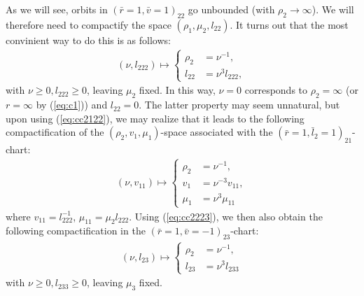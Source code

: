 \documentclass[reqno,12pt]{amsart}
\newcommand{\eqlab}[1]{\label{eq:#1}}
\renewcommand{\eqref}[1]{(\ref{eq:#1})}
\numberwithin{equation}{section}
\begin{document}
As we will see, orbits in $(\bar r=1,\bar v=1)_{22}$ go unbounded (with $\rho_2\rightarrow \infty$). We will therefore need to compactify the space $(\rho_1,\mu_2,l_{22})$. It turns out that the most convinient way to do this is as follows:
\begin{align}
 (\nu,l_{222})\mapsto \begin{cases}
                             \rho_2 &= \nu^{-1},\\
                             l_{22} &=\nu^3 l_{222},
                            \end{cases}\eqlab{c221}
\end{align}
with $\nu \ge 0,l_{222}\ge 0$, leaving $\mu_2$ fixed.
In this way, $\nu=0$ corresponds to $\rho_2=\infty $ (or $r=\infty$ by \eqref{c1}) and $l_{22}=0$. 
The latter property may seem unnatural, but upon using \eqref{cc2122}, we may realize that it leads to the following  compactification of the $(\rho_2,v_1,\mu_1)$-space associated with the $(\bar r=1,\bar l_2=1)_{21}$-chart:
\begin{align}
 (\nu,v_{11})\mapsto \begin{cases}
                             \rho_2 &= \nu^{-1},\\
                             v_{1} &=\nu^{-3} v_{11},\\
                              \mu_1 &=\nu^3 \mu_{11}
                            \end{cases}\eqlab{cv11}
\end{align}
where $v_{11}=l_{222}^{-1}$, $\mu_{11}=\mu_2 l_{222}$. Using \eqref{cc2223}, we then also obtain the following compactification in the $(\bar r=1,\bar v=-1)_{23}$-chart:
\begin{align}
 (\nu,l_{23})\mapsto \begin{cases}
                             \rho_2 &= \nu^{-1},\\
                             l_{23} &=\nu^{3} l_{233}
                            \end{cases}\eqlab{c233}
\end{align}
with $\nu\ge 0,l_{233}\ge 0$, leaving $\mu_3$ fixed.
\end{document}
